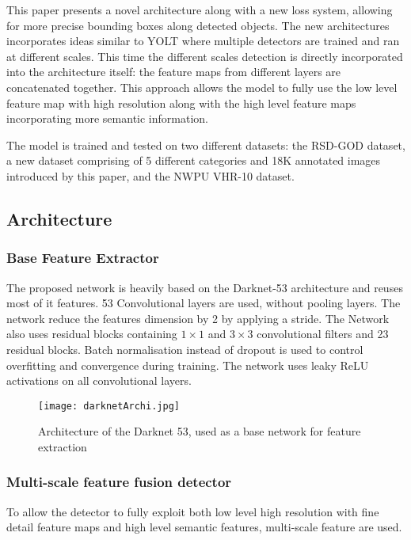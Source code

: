 
This paper presents a novel architecture along with a new loss system, allowing for more precise bounding boxes along detected objects. The new architectures incorporates ideas similar to YOLT\cite{yolt} where multiple detectors are trained and ran at different scales. This time the different scales detection is directly incorporated into the architecture itself: the feature maps from different layers are concatenated together. This approach allows the model to fully use the low level feature map with high resolution along with the high level feature maps incorporating more semantic information.

The model is trained and tested on two different datasets: the RSD-GOD dataset, a new dataset comprising of 5 different categories and 18K annotated images introduced by this paper, and the NWPU VHR-10\cite{nwpu} dataset.

\subsection{Architecture}
\subsubsection{Base Feature Extractor}
The proposed network is heavily based on the Darknet-53 architecture and reuses most of it features. 53 Convolutional layers are used, without pooling layers. The network reduce the features dimension by 2 by applying a stride. The Network also uses residual blocks containing $1 \times 1$ and $3 \times 3$ convolutional filters and 23 residual blocks. Batch normalisation\cite{batchNorm} instead of dropout is used to control overfitting and convergence during training. The network uses leaky ReLU activations on all convolutional layers. 

\begin{figure}[h!]
	\centering
	\texttt{[image: darknetArchi.jpg]}
	\caption[Architecture of the Darknet 53, used as a base network for features extraction in the Single-Shot Object Detection Framework]{Architecture of the Darknet 53, used as a base network for feature extraction}
	\label{}
\end{figure}

\subsubsection{Multi-scale feature fusion detector}
To allow the detector to fully exploit both low level high resolution with fine detail feature maps and high level semantic features, multi-scale feature are used. 

